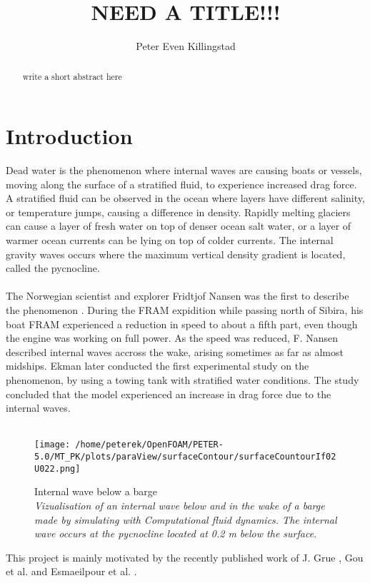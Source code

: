 \documentclass[a4paper, 12pt]{report}
\title{NEED A TITLE!!!}
\author{Peter Even Killingstad}
\begin{document}
\masterfrontpage
\begin{abstract}
 write a short abstract here
\end{abstract}
\tableofcontents

\chapter{Introduction}
Dead water is the phenomenon where internal waves are causing boats or vessels, moving along the surface of a stratified fluid, to experience increased drag force. A stratified fluid can be observed in the ocean where layers have different salinity, or temperature jumps, causing a difference in density. Rapidly melting glaciers can cause a layer of fresh water on top of denser ocean salt water, or a layer of warmer ocean currents can be lying on top of colder currents. The internal gravity waves occurs where the maximum vertical density gradient is located, called the pycnocline.\\
\\
The Norwegian scientist and explorer Fridtjof Nansen was the first to describe the phenomenon \citep{Nansen}. During the FRAM expidition while passing north of Sibira, his boat FRAM experienced a reduction in speed to about a fifth part, even though the engine was working on full power. As the speed was reduced, F. Nansen described internal waves accross the wake, arising sometimes as far as almost midships. Ekman later conducted the first experimental study on the phenomenon\cite{Ekman}, by using a towing tank with stratified water conditions. The study concluded that the model experienced an increase in drag force due to the internal waves.\\
\\
\begin{figure}[H]
	\centering
	\texttt{[image: /home/peterek/OpenFOAM/PETER-5.0/MT\_PK/plots/paraView/surfaceContour/surfaceCountourIf02U022.png]}
	\caption{Internal wave below a barge\\ \textit{Vizualisation of an internal wave below and in the wake of a barge made by simulating with Computational fluid dynamics. The internal wave occurs at the pycnocline located at 0.2 m below the surface.}}
	\label{fig:eta0}
\end{figure}
This project is mainly motivated by the recently published work of J. Grue \cite{Grue}, Gou et al. \cite{Gou} and Esmaeilpour et al. \cite{Esmaeilpour}.\\
\end{document}
